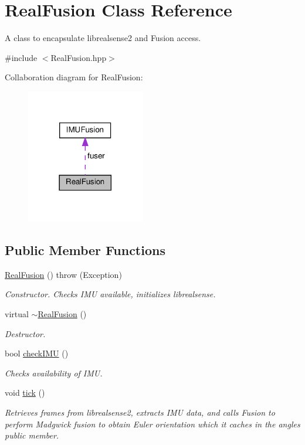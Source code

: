 \hypertarget{classRealFusion}{}\section{Real\+Fusion Class Reference}
\label{classRealFusion}


A class to encapsulate librealsense2 and Fusion access.  




{\ttfamily \#include $<$Real\+Fusion.\+hpp$>$}



Collaboration diagram for Real\+Fusion\+:\nopagebreak
\begin{figure}[H]
\begin{center}
\leavevmode
\includegraphics[width=146pt]{classRealFusion__coll__graph}
\end{center}
\end{figure}
\subsection*{Public Member Functions}
\begin{DoxyCompactItemize}
\item 
\hyperlink{classRealFusion_a9632f71572a51d7db415793e1976a958}{Real\+Fusion} ()  throw (\+Exception)
\begin{DoxyCompactList}\small\item\em Constructor. Checks I\+MU available, initializes librealsense. \end{DoxyCompactList}\item 
virtual \hyperlink{classRealFusion_a2b1dd81581a3b922da3d8231d71524ce}{$\sim$\+Real\+Fusion} ()
\begin{DoxyCompactList}\small\item\em Destructor. \end{DoxyCompactList}\item 
bool \hyperlink{classRealFusion_a77329f8bfa4390754ddb1c72b58281ff}{check\+I\+MU} ()
\begin{DoxyCompactList}\small\item\em Checks availability of I\+MU. \end{DoxyCompactList}\item 
void \hyperlink{classRealFusion_a0fa5b36d1b32622ec65c41e2c3852c2f}{tick} ()
\begin{DoxyCompactList}\small\item\em Retrieves frames from librealsense2, extracts I\+MU data, and calls Fusion to perform Madgwick fusion to obtain Euler orientation which it caches in the angles public member. \end{DoxyCompactList}\end{DoxyCompactItemize}
